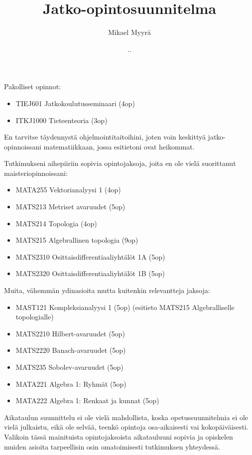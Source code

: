\documentclass{article}
\title{Jatko-opintosuunnitelma}
\author{Mikael Myyrä}
\date{\number\day.\number\month.\number\year}
\begin{document}
\maketitle

Pakolliset opinnot:

\begin{itemize}
  \item TIEJ601 Jatkokoulutusseminaari (4op)
  \item ITKJ1000 Tieteenteoria (3op)
\end{itemize}

En tarvitse täydennystä ohjelmointitaitoihini,
joten voin keskittyä jatko-opinnoissani matematiikkaan,
jossa esitietoni ovat heikommat.


Tutkimukseni aihepiiriin sopivia opintojaksoja,
joita en ole vielä suorittanut maisteriopinnoissani:

\begin{itemize}
  \item MATA255 Vektorianalyysi 1 (4op) %
  \item MATS213 Metriset avaruudet (5op)
  \item MATS214 Topologia (4op)
  \item MATS215 Algebrallinen topologia (9op) %
  \item MATS2310 Osittaisdifferentiaaliyhtälöt 1A (5op)
  \item MATS2320 Osittaisdifferentiaaliyhtälöt 1B (5op)
\end{itemize}

Muita, vähemmän ydinasioita mutta kuitenkin relevantteja jaksoja:

\begin{itemize}
  \item MAST121 Kompleksianalyysi 1 (5op)
    (esitieto MATS215 Algebralliselle topologialle)
  \item MATS2210 Hilbert-avaruudet (5op)
  \item MATS2220 Banach-avaruudet (5op)
  \item MATS235 Sobolev-avaruudet (5op)
  \item MATA221 Algebra 1: Ryhmät (5op)
  \item MATA222 Algebra 1: Renkaat ja kunnat (5op)
\end{itemize}

Aikataulun suunnittelu ei ole vielä mahdollista,
koska opetussuunnitelmia ei ole vielä julkaistu,
eikä ole selvää, teenkö opintoja osa-aikaisesti vai kokopäiväisesti.
Valikoin tässä mainituista opintojaksoista aikatauluuni sopivia
ja opiskelen muiden asioita tarpeellisin osin omatoimisesti tutkimuksen yhteydessä.
\end{document}
